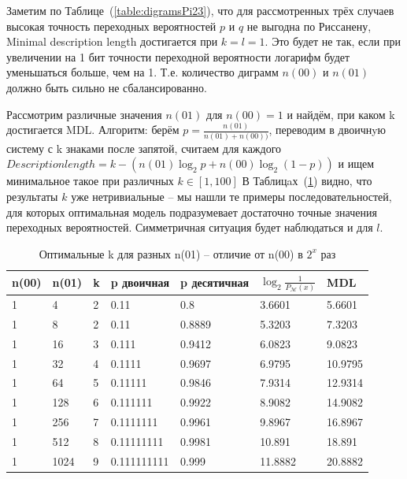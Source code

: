 \documentclass[12pt]{article}
\begin{document}
	Заметим по Таблице~(\ref{table:digramsPi23}), что для рассмотренных трёх случаев высокая точность переходных вероятностей $p$ и $q$ не выгодна по Риссанену, Minimal description length достигается при $k=l=1$. Это будет не так, если при увеличении на 1 бит точности переходной вероятности логарифм будет уменьшаться больше, чем на 1. Т.е. количество диграмм $n(00)$ и $n(01)$ должно быть сильно не сбалансированно. %
	
	Рассмотрим различные значения $n(01)$ для $n(00)=1$ и найдём, при каком k достигается MDL. Алгоритм: берём $p = \frac{n(01)}{n(01)+n(00))}$, переводим в двоичнyю систему с k знаками после запятой, считаем для каждого $Description length = k - (n(01)\log_2{p}+n(00)\log_2{(1-p)})$ и ищем минимальное такое при различных $k\in[1,100]$ В Таблицaх~(\ref{table:n00n01}) видно, что результаты $k$ уже нетривиальные -- мы нашли те примеры последовательностей, для которых оптимальная модель подразумевает достаточно точные значения переходных вероятностей. Симметричная ситуация будет наблюдаться и для $l$.
	
	\begin{table}[!h]
		\caption{Оптимальные k для разных n(01) -- отличие от n(00) в $2^x$ раз}
		\label{table:n00n01}
		\begin{center}
			\begin{tabular}{|l|l|l|l|l|l|l|}
				\hline
				n(00) & n(01) & k & p двоичная & p десятичная & $\log_2{\frac{1}{P_{\mathcal{M}}(x)}}$ & MDL \\
				\hline
				1 & 4 & 2 & 0.11 & 0.8 & 3.6601 & 5.6601 \\ 
				\hline 
				1 & 8 & 2 & 0.11 & 0.8889 & 5.3203 & 7.3203 \\ 
				\hline 
				1 & 16 & 3 & 0.111 & 0.9412 & 6.0823 & 9.0823 \\ 
				\hline 
				1 & 32 & 4 & 0.1111 & 0.9697 & 6.9795 & 10.9795 \\ 
				\hline 
				1 & 64 & 5 & 0.11111 & 0.9846 & 7.9314 & 12.9314 \\ 
				\hline 
				1 & 128 & 6 & 0.111111 & 0.9922 & 8.9082 & 14.9082 \\ 
				\hline 
				1 & 256 & 7 & 0.1111111 & 0.9961 & 9.8967 & 16.8967 \\ 
				\hline 
				1 & 512 & 8 & 0.11111111 & 0.9981 & 10.891 & 18.891 \\ 
				\hline 
				1 & 1024 & 9 & 0.111111111 & 0.999 & 11.8882 & 20.8882 \\ 
				\hline 
			\end{tabular}
		\end{center}
	\end{table}
	
\end{document}
